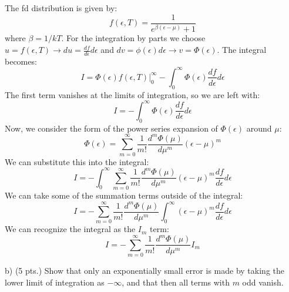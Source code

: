 \documentclass[12pt]{article}
\begin{document}
\subsection{}
The fd distribution is given by:
\begin{equation}
  f(\epsilon, T) = \frac{1}{e^{\beta(\epsilon - \mu)} + 1}
\end{equation}
where $\beta = 1/kT$.
For the integration by parts we choose $u = f(\epsilon, T) \rightarrow du = \frac{df}{d\epsilon} d\epsilon$ and $dv = \phi(\epsilon) d\epsilon \rightarrow v = \Phi(\epsilon)$. The integral becomes:
\begin{equation}
  I = \left. \Phi(\epsilon) f(\epsilon, T) \right|_{0}^{\infty} - \int_{0}^{\infty} \Phi(\epsilon) \frac{df}{d\epsilon} d\epsilon
\end{equation}
The first term vanishes at the limits of integration, so we are left with:
\begin{equation}
  I = -\int_{0}^{\infty} \Phi(\epsilon) \frac{df}{d\epsilon} d\epsilon
\end{equation}
Now, we consider the form of the power series expansion of $\Phi(\epsilon)$ around $\mu$:
\begin{equation}
  \Phi(\epsilon) = \sum_{m=0}^{\infty} \frac{1}{m!}\frac{d^m\Phi(\mu)}{d\mu^m}(\epsilon - \mu)^m
\end{equation}
We can substitute this into the integral:
\begin{equation}
  I = -\int_{0}^{\infty} \sum_{m=0}^{\infty} \frac{1}{m!}\frac{d^m\Phi(\mu)}{d\mu^m}(\epsilon - \mu)^m \frac{df}{d\epsilon} d\epsilon
\end{equation}
We can take some of the summation terms outside of the integral:
\begin{equation}
  I = -\sum_{m=0}^{\infty} \frac{1}{m!}\frac{d^m\Phi(\mu)}{d\mu^m} \int_{0}^{\infty} (\epsilon - \mu)^m \frac{df}{d\epsilon} d\epsilon
\end{equation}
We can recognize the integral as the $I_m$ term:
\begin{equation}
  I = -\sum_{m=0}^{\infty} \frac{1}{m!}\frac{d^m\Phi(\mu)}{d\mu^m} I_m
\end{equation}


b) (5 pts.) Show that only an exponentially small error is made by taking the lower limit of integration as $-\infty$, and that then all terms with $m$ odd vanish.
\end{document}

